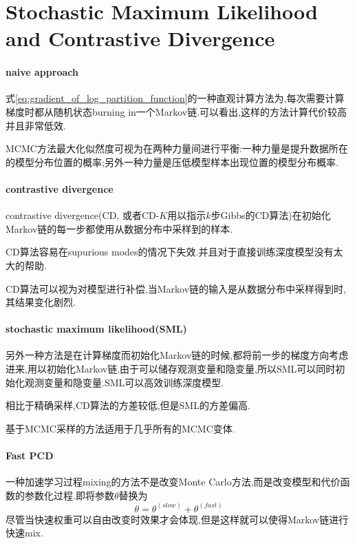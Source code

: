 \section{Stochastic Maximum Likelihood and Contrastive Divergence}

\paragraph{naive approach}式\ref{eq:gradient_of_log_partition_function}的一种直观计算方法为,每次需要计算梯度时都从随机状态burning in一个Markov链.可以看出,这样的方法计算代价较高并且非常低效.

MCMC方法最大化似然度可视为在两种力量间进行平衡:一种力量是提升数据所在的模型分布位置的概率;另外一种力量是压低模型样本出现位置的模型分布概率.

\paragraph{contrastive divergence}contrastive divergence(CD, 或者CD-$K$用以指示$k$步Gibbs的CD算法)在初始化Markov链的每一步都使用从数据分布中采样到的样本.

CD算法容易在supurious modes的情况下失效.并且对于直接训练深度模型没有太大的帮助.

CD算法可以视为对模型进行补偿,当Markov链的输入是从数据分布中采样得到时,其结果变化剧烈.

\paragraph{stochastic maximum likelihood(SML)}另外一种方法是在计算梯度而初始化Markov链的时候,都将前一步的梯度方向考虑进来,用以初始化Markov链.由于可以储存观测变量和隐变量,所以SML可以同时初始化观测变量和隐变量.SML可以高效训练深度模型.

相比于精确采样,CD算法的方差较低,但是SML的方差偏高.

基于MCMC采样的方法适用于几乎所有的MCMC变体.

\paragraph{Fast PCD}一种加速学习过程mixing的方法不是改变Monte Carlo方法,而是改变模型和代价函数的参数化过程.即将参数$\theta$替换为
\begin{equation}
\theta=\theta^{(slow)}+\theta^{(fast)}
\end{equation}
尽管当快速权重可以自由改变时效果才会体现,但是这样就可以使得Markov链进行快速mix.

